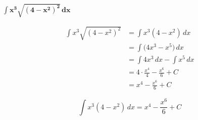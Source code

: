 $\displaystyle \mathbf{ \int 
        x^{3} \sqrt{(4 - x^{2})^{2}} 
    \,dx}$ 

\begin{align*}
\int x^{3} \sqrt{(4 - x^{2})^{2}} &=\int x^{3}(4-x^{2})\,dx \\[6pt]
&= \int \big(4x^{3}-x^{5}\big)\,dx \\[6pt]
&= \int 4x^{3}\,dx - \int x^{5}\,dx \\[6pt]
&= 4\cdot\frac{x^{4}}{4} - \frac{x^{6}}{6} + C \\[6pt]
&= x^{4} - \frac{x^{6}}{6} + C
\end{align*}


\[
\boxed{\displaystyle 
    \int x^{3}(4 - x^{2})\,dx 
    = x^{4} - \frac{x^{6}}{6} + C
}
\]
